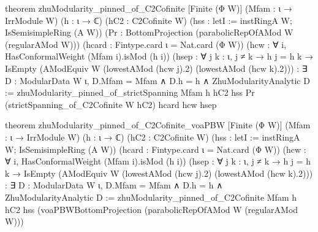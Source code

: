 \begin{leancode}
theorem zhuModularity_pinned_of_C2Cofinite [Finite (Φ W)]
    (Mfam : ι → IrrModule W) (h : ι → ℂ)
    (hC2 : C2Cofinite W)
    (hss : letI := instRingA W; IsSemisimpleRing (A W))
    (Pr : BottomProjection (parabolicRepOfAMod W (regularAMod W)))
    (hcard : Fintype.card ι = Nat.card (Φ W))
    (hcw : ∀ i, HasConformalWeight (Mfam i).isMod (h i))
    (hsep : ∀ j k : ι, j ≠ k → h j = h k →
      IsEmpty (AModEquiv W (lowestAMod (hcw j).2) (lowestAMod (hcw k).2))) :
    ∃ D : ModularData W ι, D.Mfam = Mfam ∧ D.h = h ∧ ZhuModularityAnalytic D :=
  zhuModularity_pinned_of_strictSpanning Mfam h hC2 hss Pr
    (strictSpanning_of_C2Cofinite W hC2) hcard hcw hsep

theorem zhuModularity_pinned_of_C2Cofinite_voaPBW [Finite (Φ W)]
    (Mfam : ι → IrrModule W) (h : ι → ℂ)
    (hC2 : C2Cofinite W)
    (hss : letI := instRingA W; IsSemisimpleRing (A W))
    (hcard : Fintype.card ι = Nat.card (Φ W))
    (hcw : ∀ i, HasConformalWeight (Mfam i).isMod (h i))
    (hsep : ∀ j k : ι, j ≠ k → h j = h k →
      IsEmpty (AModEquiv W (lowestAMod (hcw j).2) (lowestAMod (hcw k).2))) :
    ∃ D : ModularData W ι, D.Mfam = Mfam ∧ D.h = h ∧ ZhuModularityAnalytic D :=
  zhuModularity_pinned_of_C2Cofinite Mfam h hC2 hss
    (voaPBWBottomProjection (parabolicRepOfAMod W (regularAMod W)))
\end{leancode}

